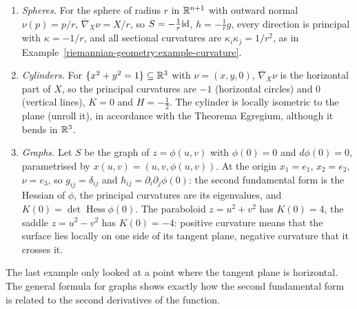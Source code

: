 \begin{example}\label{riemannian-geometry:example-surfaces}
\begin{enumerate}
\item \emph{Spheres.} For the sphere of radius $r$ in $\mathbb{R}^{n+1}$ with outward normal $\nu(p) = p/r$, $\overline{\nabla}_X\nu = X/r$, so $S = -\frac1r\mathrm{id}$, $h = -\frac1rg$, every
direction is principal with $\kappa = -1/r$, and all sectional curvatures are $\kappa_i\kappa_j = 1/r^2$, as in Example~\ref{riemannian-geometry:example-curvature}.
\item \emph{Cylinders.} For $\{x^2 + y^2 = 1\} \subseteq \mathbb{R}^3$ with $\nu = (x, y, 0)$, $\overline{\nabla}_X\nu$ is the horizontal part of $X$, so the principal curvatures are
$-1$ (horizontal circles) and $0$ (vertical lines), $K = 0$ and $H = -\frac12$. The cylinder is locally isometric to the plane (unroll it), in accordance with the Theorema
Egregium, although it bends in $\mathbb{R}^3$.
\item \emph{Graphs.} Let $S$ be the graph of $z = \phi(u, v)$ with $\phi(0) = 0$ and $d\phi(0) = 0$, parametrised by $x(u, v) = (u, v, \phi(u, v))$. At the origin
$x_1 = e_1$, $x_2 = e_2$, $\nu = e_3$, so $g_{ij} = \delta_{ij}$ and $h_{ij} = \partial_i\partial_j\phi(0)$: the second fundamental form is the Hessian of $\phi$, the principal
curvatures are its eigenvalues, and $K(0) = \det\operatorname{Hess}\phi(0)$. The paraboloid $z = u^2 + v^2$ has $K(0) = 4$, the saddle $z = u^2 - v^2$ has $K(0) = -4$: positive
curvature means that the surface lies locally on one side of its tangent plane, negative curvature that it crosses it.
\end{enumerate}
\end{example}

The last example only looked at a point where the tangent plane is horizontal. The general formula for graphs shows exactly how the second fundamental form is related to the second derivatives of
the function.

